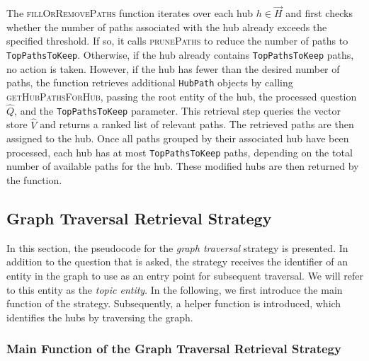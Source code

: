 The \textsc{fillOrRemovePaths} function iterates over each hub \(h \in \vec{H}\) and first checks whether the number of paths associated with the hub already exceeds the specified threshold. If so, it calls \textsc{prunePaths} to reduce the number of paths to \texttt{TopPathsToKeep}. Otherwise, if the hub already contains \texttt{TopPathsToKeep} paths, no action is taken. However, if the hub has fewer than the desired number of paths, the function retrieves additional \texttt{HubPath} objects by calling \textsc{getHubPathsForHub}, passing the root entity of the hub, the processed question \(\hat{Q}\), and the \texttt{TopPathsToKeep} parameter. This retrieval step queries the vector store \(\hat{V}\) and returns a ranked list of relevant paths. The retrieved paths are then assigned to the hub. Once all paths grouped by their associated hub have been processed, each hub has at most \texttt{TopPathsToKeep} paths, depending on the total number of available paths for the hub. These modified hubs are then returned by the function.

\subsection{Graph Traversal Retrieval Strategy}

In this section, the pseudocode for the \emph{graph traversal} strategy is presented. In addition to the question that is asked, the strategy receives the identifier of an entity in the graph to use as an entry point for subsequent traversal. We will refer to this entity as the \emph{topic entity}. In the following, we first introduce the main function of the strategy. Subsequently, a helper function is introduced, which identifies the hubs by traversing the graph.

\subsubsection{Main Function of the Graph Traversal Retrieval Strategy}

